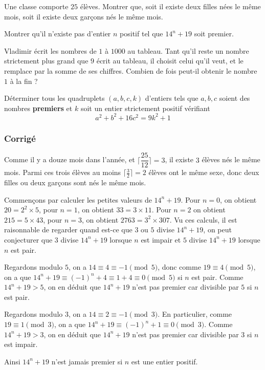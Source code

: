 \begin{exo}
Une classe comporte $25$ élèves. Montrer que, soit il existe deux filles nées le même mois, soit il existe deux garçons nés le même mois.
\end{exo}


\begin{exo}
Montrer qu'il n'existe pas d'entier $n$ positif tel que $14^n+19$ soit premier.
\end{exo}


\begin{exo}
Vladimir écrit les nombres de $1$ à $1000$ au tableau. Tant qu'il reste un nombre strictement plus grand que $9$ écrit au tableau, il choisit celui qu'il veut, et le remplace par la somme de ses chiffres. Combien de fois peut-il obtenir le nombre $1$ à la fin ?
\end{exo}


\begin{exo}
Déterminer tous les quadruplets $(a, b, c, k)$ d'entiers tels que $a, b, c$ soient des nombres \textbf{premiers} et $k$ soit un entier strictement positif vérifiant
$$a^2 + b^2 + 16c^2 = 9k^2 + 1$$
\end{exo}


\subsubsection{Corrigé}


\begin{sol}
Comme il y a douze mois dans l'année, et $\lceil\dfrac{25}{12}\rceil=3$, il existe $3$ élèves nés le même mois. Parmi ces trois élèves au moins $\lceil\frac{3}{2}\rceil = 2$ élèves ont le même sexe, donc deux filles ou deux garçons sont nés le même mois.
\end{sol}


\begin{sol}
Commençons par calculer les petites valeurs de $14^n+19$. Pour $n=0$, on obtient $20=2^2\times 5$, pour $n=1$, on obtient $33=3\times 11$. Pour $n=2$ on obtient $215=5\times 43$, pour $n=3$, on obtient $2763=3^2\times 307$. Vu ces calculs, il est raisonnable de regarder quand est-ce que $3$ ou $5$ divise $14^n+19$, on peut conjecturer que $3$ divise $14^n+19$ lorsque $n$ est impair et $5$ divise $14^n+19$ lorsque $n$ est pair.

Regardons modulo $5$, on a $14\equiv 4\equiv -1\pmod{5}$, donc comme $19\equiv 4\pmod{5}$, on a que $14^n+19\equiv (-1)^n+4\equiv 1+4\equiv 0\pmod{5}$ si $n$ est pair. Comme $14^n+19>5$, on en déduit que $14^n+19$ n'est pas premier car divisible par $5$ si $n$ est pair.

Regardons modulo $3$, on a $14\equiv 2\equiv -1\pmod{3}$. En particulier, comme $19\equiv 1\pmod{3}$, on a que $14^n+19\equiv (-1)^n+1\equiv 0 \pmod{3}$. Comme $14^n+19>3$, on en déduit que $14^n+19$ n'est pas premier car divisible par $3$ si $n$ est impair.

Ainsi $14^n+19$ n'est jamais premier si $n$ est une entier positif.
\end{sol}


